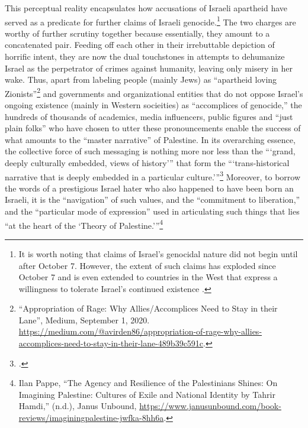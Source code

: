\documentclass[../unravbook.tex]{subfiles}
\begin{document}
\begin{spacing}{1.2}
This perceptual reality encapsulates how accusations of Israeli apartheid have served as a predicate for further claims of Israeli genocide.\footnote{It is worth noting that claims of Israel's genocidal nature did not begin until after October 7. \parencite[59, (\enquote{I consider the Nakba itself to be an act of genocide.})]{Abdo-2018} However, the extent of such claims has exploded since October 7 and is even extended to countries in the West that express a willingness to tolerate Israel's continued existence \parencite[ (\enquote{As it has happened for the past five centuries, the Palestinian Genocide shows that European settler colonialism continues to perform one of its historical tasks: genocide. Empires and former empires like the US, the UK, and France continue to be authors and accomplices of genocide by enabling the genocidal aggression of a people.}]{Barreto-2024}.}  The two charges are worthy of further scrutiny together because essentially, they amount to a concatenated pair. Feeding off each other in their irrebuttable depiction of horrific intent, they are now the dual touchstones in attempts to dehumanize Israel as the perpetrator of crimes against humanity, leaving only misery in her wake. Thus, apart from labeling people (mainly Jews) as \enquote{apartheid loving Zionists}\footnote{\enquote{Appropriation of Rage: Why Allies/Accomplices Need to Stay in their Lane}, Medium, September 1, 2020. \url{https://medium.com/@avirden86/appropriation-of-rage-why-allies-accomplices-need-to-stay-in-their-lane-489b39c591c}.} and governments and organizational entities that do not oppose Israel's ongoing existence (mainly in Western socieities)  as ``accomplices of genocide,'' the hundreds of thousands of academics, media influencers, public figures and \enquote{just plain folks} who have chosen to utter these pronouncements enable the success of what amounts to the \enquote{master narrative} of Palestine. In its overarching essence, the collective force of such messaging is nothing more nor less than the \enquote{\enquote*{grand, deeply culturally embedded, views of history}} that form the \enquote{\enquote*{trans-historical narrative that is deeply embedded in a particular culture.}}\footcite[][15. Citations omitted.]{Coticchia-2022} Moreover, to borrow the words of a prestigious Israel hater who also happened to have been born an Israeli, it is the \enquote{navigation} of such values, and the \enquote{commitment to liberation,} and the \enquote{particular mode of expression} used in articulating such things that lies \enquote{at the heart of the \enquote*{Theory of Palestine.}}\footnote{Ilan Pappe, \enquote{The Agency and Resilience of the Palestinians Shines: On Imagining Palestine: Cultures of Exile and National Identity by Tahrir Hamdi,} (n.d.), Janus Unbound, \url{https://www.janusunbound.com/book-reviews/imaginingpalestine-jwfka-8hh6a}.}


\end{spacing}
\end{document}
